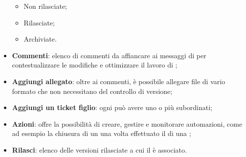 \begin{itemize}
    \begin{itemize}
      \item Non rilasciate;
      \item Rilasciate;
      \item Archiviate.
    \end{itemize}
  \item \textbf{Commenti}: elenco di commenti da affiancare ai messaggi di  per contestualizzare le modifiche e ottimizzare il lavoro di ;
  \item \textbf{Aggiungi allegato}: oltre ai commenti, è possibile allegare file di vario formato che non necessitano del controllo di versione;
  \item \textbf{Aggiungi un ticket figlio}: ogni  può avere uno o più  subordinati;
  \item \textbf{Azioni}:  offre la possibilità di creare, gestire e monitorare automazioni, come ad esempio la chiusura di un  una volta effettuato il  di una ;
  \item \textbf{Rilasci}: elenco delle versioni rilasciate a cui il  è associato.
\end{itemize}

